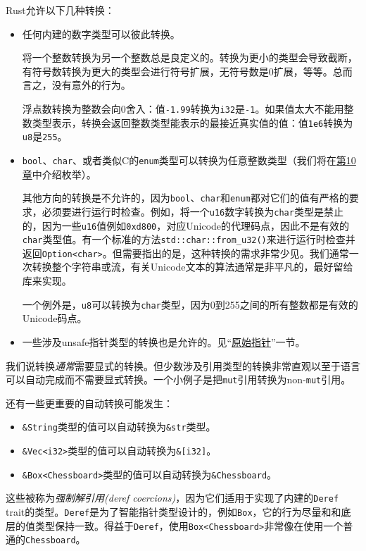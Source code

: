 Rust允许以下几种转换：
\begin{itemize}
    \item 任何内建的数字类型可以彼此转换。
    
    将一个整数转换为另一个整数总是良定义的。转换为更小的类型会导致截断，有符号数转换为更大的类型会进行符号扩展，无符号数是0扩展，等等。总而言之，没有意外的行为。

    浮点数转换为整数会向0舍入：值\texttt{-1.99}转换为\texttt{i32}是\texttt{-1}。如果值太大不能用整数类型表示，转换会返回整数类型能表示的最接近真实值的值：值\texttt{1e6}转换为\texttt{u8}是\texttt{255}。

    \item \texttt{bool}、\texttt{char}、或者类似C的\texttt{enum}类型可以转换为任意整数类型（我们将在\hyperref[ch10]{第10章}中介绍枚举）。
    
    其他方向的转换是不允许的，因为\texttt{bool}、\texttt{char}和\texttt{enum}都对它们的值有严格的要求，必须要进行运行时检查。例如，将一个\texttt{u16}数字转换为\texttt{char}类型是禁止的，因为一些\texttt{u16}值例如\texttt{0xd800}，对应Unicode的代理码点，因此不是有效的\texttt{char}类型值。有一个标准的方法\texttt{std::char::from\_u32()}来进行运行时检查并返回\texttt{Option<char>}。但需要指出的是，这种转换的需求非常少见。我们通常一次转换整个字符串或流，有关Unicode文本的算法通常是非平凡的，最好留给库来实现。

    一个例外是，\texttt{u8}可以转换为\texttt{char}类型，因为0到255之间的所有整数都是有效的Unicode码点。

    \item 一些涉及unsafe指针类型的转换也是允许的。见“\hyperref[rawp]{原始指针}”一节。
\end{itemize}

我们说转换\emph{通常}需要显式的转换。但少数涉及引用类型的转换非常直观以至于语言可以自动完成而不需要显式转换。一个小例子是把\texttt{mut}引用转换为non-\texttt{mut}引用。

还有一些更重要的自动转换可能发生：
\begin{itemize}
    \item \texttt{\&String}类型的值可以自动转换为\texttt{\&str}类型。
    \item \texttt{\&Vec<i32>}类型的值可以自动转换为\texttt{\&[i32]}。
    \item \texttt{\&Box<Chessboard>}类型的值可以自动转换为\texttt{\&Chessboard}。
\end{itemize}

这些被称为\emph{强制解引用(deref coercions)}，因为它们适用于实现了内建的\texttt{Deref} trait的类型。\texttt{Deref}是为了智能指针类型设计的，例如\texttt{Box}，它的行为尽量和和底层的值类型保持一致。得益于\texttt{Deref}，使用\texttt{Box<Chessboard>}非常像在使用一个普通的\texttt{Chessboard}。


